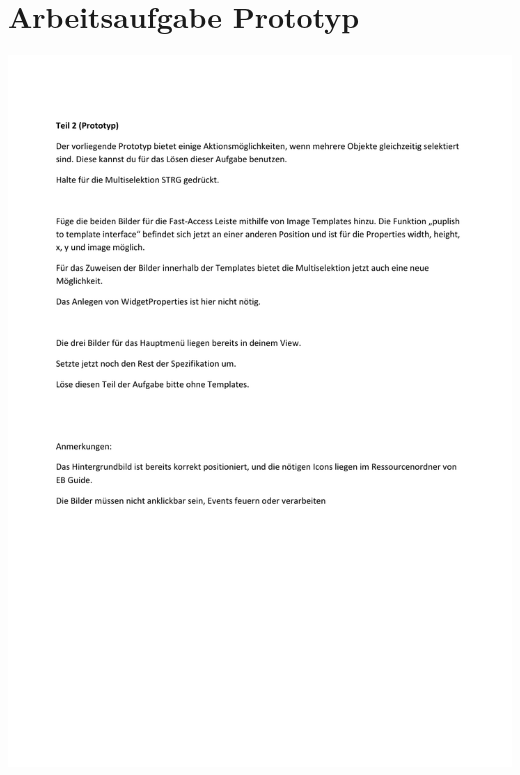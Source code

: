 \chapter{Arbeitsaufgabe Prototyp}\label{app:Aufgabe_Prototyp}
\begin{center}
  \includegraphics[scale=0.9]{supplement/Arbeitsaufgabe_Prototyp_Teil2.pdf}
\end{center}

